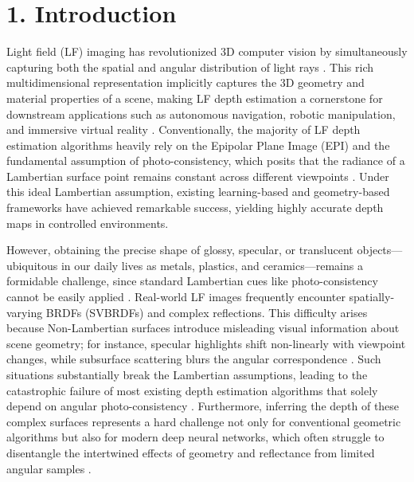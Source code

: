 \documentclass[lettersize,journal]{IEEEtran}
\begin{document}
\begin{IEEEkeywords}

\end{IEEEkeywords}

\section{1. Introduction}

Light field (LF) imaging has revolutionized 3D computer vision by simultaneously capturing both the spatial and angular distribution of light rays \cite{lightfieldimaging3Dreconst}. This rich multidimensional representation implicitly captures the 3D geometry and material properties of a scene, making LF depth estimation a cornerstone for downstream applications such as autonomous navigation, robotic manipulation, and immersive virtual reality \cite{autonomousnavigationrobotic}. Conventionally, the majority of LF depth estimation algorithms heavily rely on the Epipolar Plane Image (EPI) and the fundamental assumption of photo-consistency, which posits that the radiance of a Lambertian surface point remains constant across different viewpoints \cite{EpipolarPlaneImagesphotoco}. Under this ideal Lambertian assumption, existing learning-based and geometry-based frameworks have achieved remarkable success, yielding highly accurate depth maps in controlled environments.

However, obtaining the precise shape of glossy, specular, or translucent objects—ubiquitous in our daily lives as metals, plastics, and ceramics—remains a formidable challenge, since standard Lambertian cues like photo-consistency cannot be easily applied \cite{glossyobjectsspecularreflec}. Real-world LF images frequently encounter spatially-varying BRDFs (SVBRDFs) and complex reflections. This difficulty arises because Non-Lambertian surfaces introduce misleading visual information about scene geometry; for instance, specular highlights shift non-linearly with viewpoint changes, while subsurface scattering blurs the angular correspondence \cite{spatiallyvaryingBRDFsmislea}. Such situations substantially break the Lambertian assumptions, leading to the catastrophic failure of most existing depth estimation algorithms that solely depend on angular photo-consistency \cite{Lambertianassumptionsangular}. Furthermore, inferring the depth of these complex surfaces represents a hard challenge not only for conventional geometric algorithms but also for modern deep neural networks, which often struggle to disentangle the intertwined effects of geometry and reflectance from limited angular samples \cite{deepneuralnetworksdisentang}.
\end{document}
